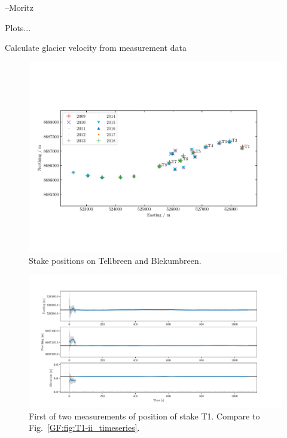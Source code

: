 --Moritz


Plots...

Calculate glacier velocity from measurement data

\begin{figure}[H]
    \centering
    \includegraphics[width=\textwidth]{./figs/stakePositions.pdf}
    \caption{Stake positions on Tellbreen and Blekumbreen.}
    \label{GF:fig:stakepos}
\end{figure}



\begin{figure}[H]
    \centering
    \includegraphics[width=\textwidth]{./figs/timeseries/46250700_corr-T1-i-2017_Timeseries-east-north-elev.pdf}
    \caption{First of two measurements of position of stake T1. Compare to Fig.~\ref{GF:fig:T1-ii_timeseries}.}
    \label{GF:fig:T1-i_timeseries}
\end{figure}


